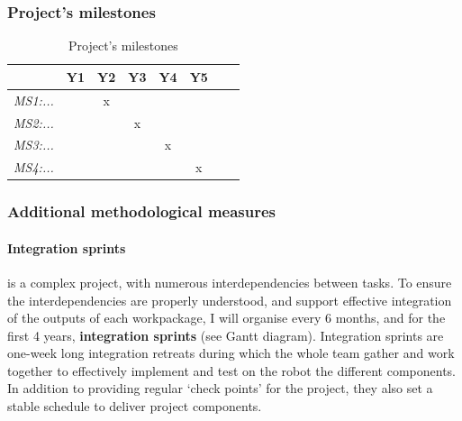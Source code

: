 \begin{figure}[!h]
\resizebox{\linewidth}{!}{
    
}
\label{gantt}
\end{figure}


\subsubsection{Project's milestones}

\begin{table}[h!]
    \centering
\begin{tabular}{@{}lccccccr@{}}
\toprule
\textit{\textbf{}}              & \textbf{Y1} & \textbf{Y2} & \textbf{Y3} & \textbf{Y4} & \textbf{Y5} \\ \midrule
\textit{MS1:...} &   & x  &    &   &    &  &   \\ 
\textit{MS2:...} &   &    & x  &   &    &  &   \\ 
\textit{MS3:...} &   &    &    & x &    &  &   \\ 
\textit{MS4:...} &   &    &    &   & x  &  &   \\ \bottomrule
\end{tabular}
    \caption{Project's milestones}
    \label{milestones}
\end{table}

\subsubsection{Additional methodological measures}

\paragraph{Integration sprints}

\project is a complex project, with numerous interdependencies between tasks.
To ensure the interdependencies are properly understood, and support effective
integration of the outputs of each workpackage, I will organise every 6 months,
and for the first 4 years, \textbf{integration sprints} (see Gantt diagram).
Integration sprints are one-week long integration retreats during which the whole
\project team gather and work together to effectively implement and test on the
robot the different components. In addition to providing regular `check points'
for the project, they also set a stable schedule to deliver project components.

